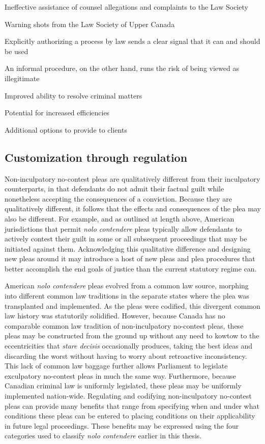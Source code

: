 Ineffective assistance of counsel allegations and complaints to the Law Society

Warning shots from the Law Society of Upper Canada

Explicitly authorizing a process by law sends a clear signal that it can and should be used

An informal procedure, on the other hand, runs the risk of being viewed as illegitimate

Improved ability to resolve criminal matters

Potential for increased efficiencies

Additional options to provide to clients

\subsection{Customization through regulation}

Non-inculpatory no-contest pleas are qualitatively different from their inculpatory counterparts, in that defendants do not admit their factual guilt while nonetheless accepting the consequences of a conviction. Because they are qualitatively different, it follows that the effects and consequences of the plea may also be different. For example, and as outlined at length above, American jurisdictions that permit \textit{nolo contendere} pleas typically allow defendants to actively contest their guilt in some or all subsequent proceedings that may be initiated against them. Acknowledging this qualitative difference and designing new pleas around it may introduce a host of new pleas and plea procedures that better accomplish the end goals of justice than the current statutory regime can.

American \textit{nolo contendere} pleas evolved from a common law source, morphing into different common law traditions in the separate states where the plea was transplanted and implemented. As the pleas were codified, this divergent common law history was statutorily solidified. However, because Canada has no comparable common law tradition of non-inculpatory no-contest pleas, these pleas may be constructed from the ground up without any need to kowtow to the eccentricities that \textit{stare decisis} occasionally produces, taking the best ideas and discarding the worst without having to worry about retroactive inconsistency. This lack of common law baggage further allows Parliament to legislate exculpatory no-contest pleas in much the same way. Furthermore, because Canadian criminal law is uniformly legislated, these pleas may be uniformly implemented nation-wide. Regulating and codifying non-inculpatory no-contest pleas can provide many benefits that range from specifying when and under what conditions these pleas can be entered to placing conditions on their applicability in future legal proceedings. These benefits may be expressed using the four categories used to classify \textit{nolo contendere} earlier in this thesis.

